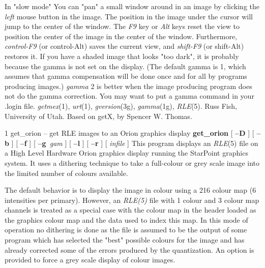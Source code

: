 In "slow mode" You can "pan" a small window around in an image by
clicking the
{\it left} mouse button
in the image.  The position in the image
under the cursor will jump to the center of the window.  The
{\it F9} key
or
{\it Alt} keys
reset the view to position the center of the image in the center of the
window.  Furthermore,
{\it control-F9} (or control-Alt)
saves the current view, and
{\it shift-F9} (or shift-Alt)
restores it.
If you have a shaded image that looks "too dark", it is probably because the
gamma is not set on the display.  (The default gamma is 1, which assumes that
gamma compensation will be done once and for all by programs producing images.)
{\it gamma} 2
is better when the image producing program does not do the gamma correction.
You may want to put a gamma command in your .login file.
{\it getmex}{\rm (1),}
{\it urt}{\rm (1),}
{\it gversion}{\rm (3g),}
{\it gamma}{\rm (1g),}
{\it RLE}{\rm (5).}
Russ Fish, University of Utah.
Based on getX, by Spencer W. Thomas.
\newpage


%
%
%
 1
get\_orion -- get RLE images to an Orion graphics display
{\bf get\_orion}
[
{\bf --D}
] [
{\bf --b}
] [
{\bf --f}
] [
{\bf --g}{\it \ gam}
] [
{\bf --l}
] [
{\bf --r}
] [ 
{\it infile}
]
This program displays an
{\it RLE}{\rm (5)}
file on a High Level Hardware Orion graphics display running the StarPoint 
graphics system.  It uses a
dithering technique to take a full-colour or grey scale image into
the limited number of colours available.

The default behavior is to display the image in colour using
a 216 colour map (6 intensities per primary). However, an 
{\it RLE(5)}
file with 1 colour and 3 colour map channels is treated as a
special case with the colour map in the header loaded as the graphics 
colour map
and the data used to index this map.  In this mode of operation no
dithering is done as the file is assumed to be the output of some
program which has selected the "best" possible colours for the image
and has already corrected some of the errors produced by the quantization.  
An option is provided to force a grey scale display of colour images.


